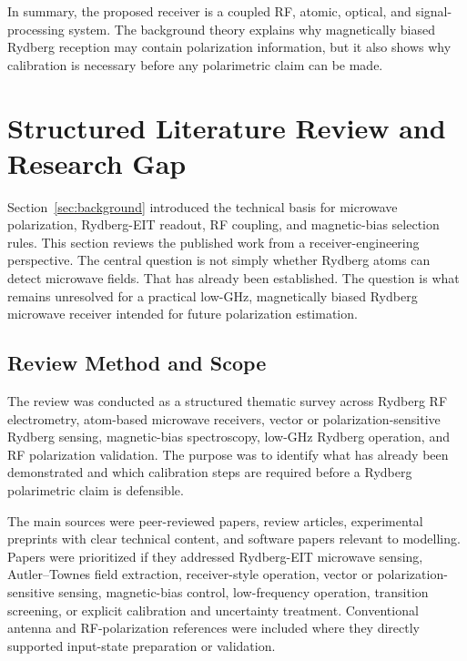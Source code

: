 \documentclass{ieeeaccess}
\begin{document}
In summary, the proposed receiver is a coupled RF, atomic, optical, and signal-processing system. The background theory explains why magnetically biased Rydberg reception may contain polarization information, but it also shows why calibration is necessary before any polarimetric claim can be made.

\section{Structured Literature Review and Research Gap}
\label{sec:literature}

Section~\ref{sec:background} introduced the technical basis for microwave polarization, Rydberg-EIT readout, RF coupling, and magnetic-bias selection rules. This section reviews the published work from a receiver-engineering perspective. The central question is not simply whether Rydberg atoms can detect microwave fields. That has already been established. The question is what remains unresolved for a practical low-GHz, magnetically biased Rydberg microwave receiver intended for future polarization estimation.

\subsection{Review Method and Scope}
\label{subsec:lit_method}

The review was conducted as a structured thematic survey across Rydberg RF electrometry, atom-based microwave receivers, vector or polarization-sensitive Rydberg sensing, magnetic-bias spectroscopy, low-GHz Rydberg operation, and RF polarization validation. The purpose was to identify what has already been demonstrated and which calibration steps are required before a Rydberg polarimetric claim is defensible.

The main sources were peer-reviewed papers, review articles, experimental preprints with clear technical content, and software papers relevant to modelling. Papers were prioritized if they addressed Rydberg-EIT microwave sensing, Autler--Townes field extraction, receiver-style operation, vector or polarization-sensitive sensing, magnetic-bias control, low-frequency operation, transition screening, or explicit calibration and uncertainty treatment. Conventional antenna and RF-polarization references were included where they directly supported input-state preparation or validation.
\end{document}
